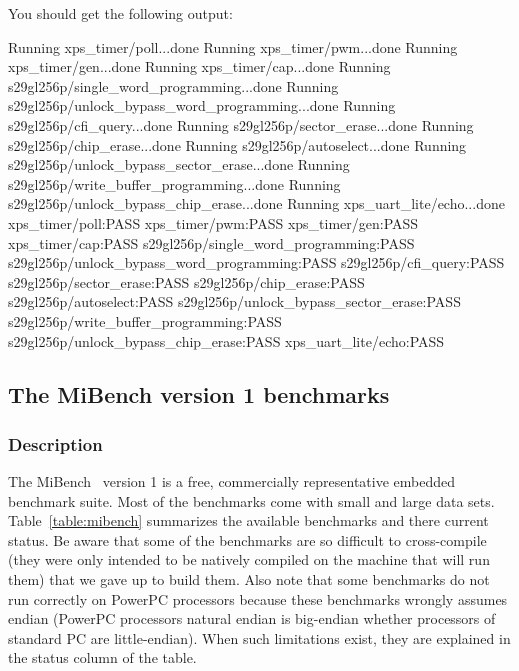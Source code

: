 \noindent You should get the following output:
\begin{script}
Running xps_timer/poll...done
Running xps_timer/pwm...done
Running xps_timer/gen...done
Running xps_timer/cap...done
Running s29gl256p/single_word_programming...done
Running s29gl256p/unlock_bypass_word_programming...done
Running s29gl256p/cfi_query...done
Running s29gl256p/sector_erase...done
Running s29gl256p/chip_erase...done
Running s29gl256p/autoselect...done
Running s29gl256p/unlock_bypass_sector_erase...done
Running s29gl256p/write_buffer_programming...done
Running s29gl256p/unlock_bypass_chip_erase...done
Running xps_uart_lite/echo...done
xps_timer/poll:PASS
xps_timer/pwm:PASS
xps_timer/gen:PASS
xps_timer/cap:PASS
s29gl256p/single_word_programming:PASS
s29gl256p/unlock_bypass_word_programming:PASS
s29gl256p/cfi_query:PASS
s29gl256p/sector_erase:PASS
s29gl256p/chip_erase:PASS
s29gl256p/autoselect:PASS
s29gl256p/unlock_bypass_sector_erase:PASS
s29gl256p/write_buffer_programming:PASS
s29gl256p/unlock_bypass_chip_erase:PASS
xps_uart_lite/echo:PASS
\end{script}

\cleardoublepage

\subsection{The MiBench version 1 benchmarks}

\subsubsection{Description}
The MiBench~\cite{mibench, mibenchwebsite} version 1 is a free, commercially representative embedded benchmark suite.
Most of the benchmarks come with small and large data sets.
Table~\ref{table:mibench} summarizes the available benchmarks and there current status.
Be aware that some of the benchmarks are so difficult to cross-compile (they were only intended to be natively compiled on the machine that will run them) that we gave up to build them.
Also note that some benchmarks do not run correctly on PowerPC processors because these benchmarks wrongly assumes endian (PowerPC processors natural endian is big-endian whether processors of standard PC are little-endian).
When such limitations exist, they are explained in the status column of the table.

